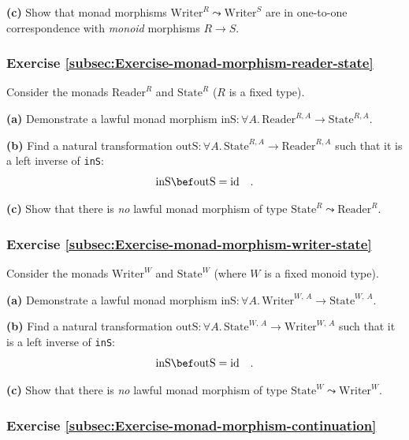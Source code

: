 \textbf{(c)} Show that monad morphisms $\text{Writer}^{R}\leadsto\text{Writer}^{S}$
are in one-to-one correspondence with \emph{monoid} morphisms $R\rightarrow S$.

\subsubsection{Exercise \label{subsec:Exercise-monad-morphism-reader-state}\ref{subsec:Exercise-monad-morphism-reader-state}}

Consider the monads $\text{Reader}^{R}$ and $\text{State}^{R}$ ($R$
is a fixed type).

\textbf{(a)} Demonstrate a lawful monad morphism $\text{inS}:\forall A.\,\text{Reader}^{R,A}\rightarrow\text{State}^{R,A}$.

\textbf{(b)} Find a natural transformation $\text{outS}:\forall A.\,\text{State}^{R,A}\rightarrow\text{Reader}^{R,A}$
such that it is a left inverse of \lstinline!inS!: 
\[
\text{inS}\bef\text{outS}=\text{id}\quad.
\]

\textbf{(c)} Show that there is \emph{no} lawful monad morphism of
type $\text{State}^{R}\leadsto\text{Reader}^{R}$.

\subsubsection{Exercise \label{subsec:Exercise-monad-morphism-writer-state}\ref{subsec:Exercise-monad-morphism-writer-state}}

Consider the monads $\text{Writer}^{W}$ and $\text{State}^{W}$ (where
$W$ is a fixed monoid type).

\textbf{(a)} Demonstrate a lawful monad morphism $\text{inS}:\forall A.\,\text{Writer}^{W,\,A}\rightarrow\text{State}^{W,\,A}$.

\textbf{(b)} Find a natural transformation $\text{outS}:\forall A.\,\text{State}^{W,\,A}\rightarrow\text{Writer}^{W,\,A}$
such that it is a left inverse of \lstinline!inS!: 
\[
\text{inS}\bef\text{outS}=\text{id}\quad.
\]

\textbf{(c)} Show that there is \emph{no} lawful monad morphism of
type $\text{State}^{W}\leadsto\text{Writer}^{W}$.

\subsubsection{Exercise \label{subsec:Exercise-monad-morphism-continuation}\ref{subsec:Exercise-monad-morphism-continuation}}

